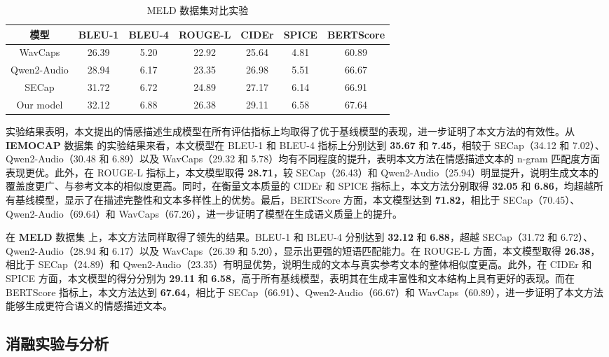 \begin{table}
  \centering
  \caption{MELD 数据集对比实验}
  \label{tab:MELD对比实验}
  \begin{tabular}{ccccccc}
    \toprule
    模型 & BLEU-1 & BLEU-4 & ROUGE-L & CIDEr & SPICE & BERTScore \\
    \midrule
    WavCaps & 26.39 & 5.20 & 22.92 & 25.64 & 4.81 & 60.89 \\
    Qwen2-Audio & 28.94 & 6.17 & 23.35 & 26.98 & 5.51 & 66.67 \\
    SECap & 31.72 & 6.72 & 24.89 & 27.17 & 6.14 & 66.91 \\
    Our model & 32.12 & 6.88 & 26.38 & 29.11 & 6.58 & 67.64 \\
    \bottomrule
  \end{tabular}
\end{table}

实验结果表明，本文提出的情感描述生成模型在所有评估指标上均取得了优于基线模型的表现，进一步证明了本文方法的有效性。从 \textbf{IEMOCAP} 数据集 的实验结果来看，本文模型在 BLEU-1 和 BLEU-4 指标上分别达到 \textbf{35.67} 和 \textbf{7.45}，相较于 SECap（34.12 和 7.02）、Qwen2-Audio（30.48 和 6.89）以及 WavCaps（29.32 和 5.78）均有不同程度的提升，表明本文方法在情感描述文本的 n-gram 匹配度方面表现更优。此外，在 ROUGE-L 指标上，本文模型取得 \textbf{28.71}，较 SECap（26.43）和 Qwen2-Audio（25.94）明显提升，说明生成文本的覆盖度更广、与参考文本的相似度更高。同时，在衡量文本质量的 CIDEr 和 SPICE 指标上，本文方法分别取得 \textbf{32.05} 和 \textbf{6.86}，均超越所有基线模型，显示了在描述完整性和文本多样性上的优势。最后，BERTScore 方面，本文模型达到 \textbf{71.82}，相比于 SECap（70.45）、Qwen2-Audio（69.64）和 WavCaps（67.26），进一步证明了模型在生成语义质量上的提升。

在 \textbf{MELD} 数据集 上，本文方法同样取得了领先的结果。BLEU-1 和 BLEU-4 分别达到 \textbf{32.12} 和 \textbf{6.88}，超越 SECap（31.72 和 6.72）、Qwen2-Audio（28.94 和 6.17）以及 WavCaps（26.39 和 5.20），显示出更强的短语匹配能力。在 ROUGE-L 方面，本文模型取得 \textbf{26.38}，相比于 SECap（24.89）和 Qwen2-Audio（23.35）有明显优势，说明生成的文本与真实参考文本的整体相似度更高。此外，在 CIDEr 和 SPICE 方面，本文模型的得分分别为 \textbf{29.11} 和 \textbf{6.58}，高于所有基线模型，表明其在生成丰富性和文本结构上具有更好的表现。而在 BERTScore 指标上，本文方法达到 \textbf{67.64}，相比于 SECap（66.91）、Qwen2-Audio（66.67）和 WavCaps（60.89），进一步证明了本文方法能够生成更符合语义的情感描述文本。

\subsection{消融实验与分析}

